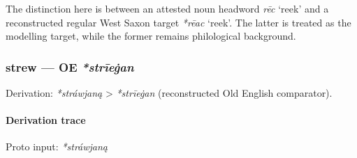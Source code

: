\documentclass[
  british,
  a4paper,
]{article}
\providecommand{\Recon}[1]{\emph{*#1}}
\begin{document}
The distinction here is between an attested noun headword {\emph{rēc}}
`reek' and a reconstructed regular West Saxon target \Recon{rēac}
`reek'. The latter is treated as the modelling target, while the former
remains philological background.

\subsubsection{\texorpdfstring{strew --- OE
\emph{*strīeġan}}{strew --- OE *strīeġan}}\label{strew-oe-strux12beux121an}

Derivation: \emph{*stráwjaną} \textgreater{} \emph{*strīeġan}
(reconstructed Old English comparator).

\paragraph{Derivation trace}\label{derivation-trace-152}

Proto input: \emph{*stráwjaną}

\begingroup
\setlength{\fboxsep}{6pt}
\end{document}

